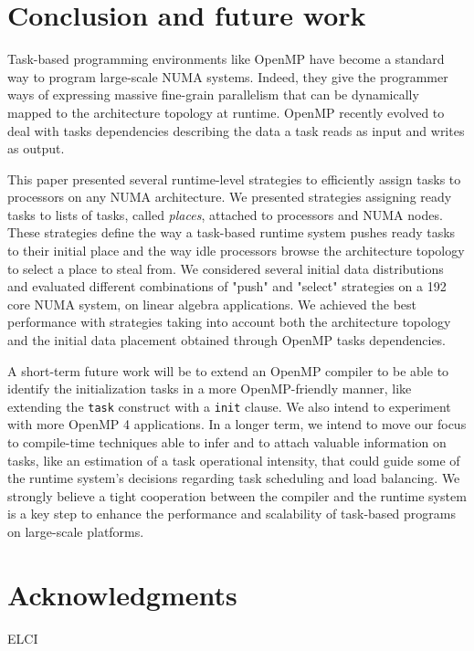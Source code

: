 \documentclass{Styles/llncs}
\begin{document}

\section{Conclusion and future work}
Task-based programming environments like OpenMP have become a standard way to program large-scale NUMA systems.
Indeed, they give the programmer ways of expressing massive fine-grain parallelism that can be dynamically mapped to the architecture topology at runtime.
OpenMP recently evolved to deal with tasks dependencies describing the data a task reads as input and writes as output. 

This paper presented several runtime-level strategies to efficiently assign tasks to processors on any NUMA architecture. We presented strategies assigning ready tasks to lists of tasks, called \emph{places}, attached to processors and NUMA nodes. These strategies define the way a task-based runtime system pushes ready tasks to their initial place and the way idle processors browse the architecture topology to select a place to steal from. We considered several initial data distributions and evaluated different combinations of "push" and "select" strategies on a 192 core NUMA system, on linear algebra applications. We achieved the best performance with strategies taking into account both the architecture topology and the initial data placement obtained through OpenMP tasks dependencies.

A short-term future work will be to extend an OpenMP compiler to be able to identify the initialization tasks in a more OpenMP-friendly manner, like extending the \verb!task! construct with a \verb!init! clause. We also intend to experiment with more OpenMP 4 applications.
In a longer term, we intend to move our focus to compile-time techniques able to infer and to attach valuable information on tasks, like an estimation of a task operational intensity, that could guide some of the runtime system's decisions regarding task scheduling and load balancing. We strongly believe a tight cooperation between the compiler and the runtime system is a key step to enhance the performance and scalability of task-based programs on large-scale platforms.

\section*{Acknowledgments}

ELCI
  \small 
  
\end{document}
